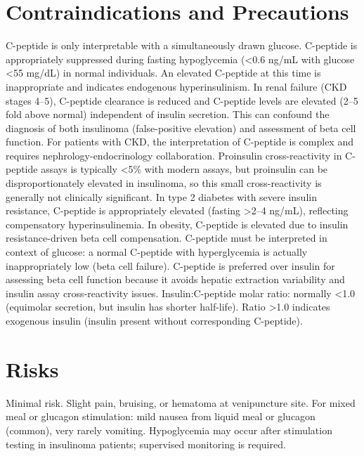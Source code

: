 \section*{Contraindications and Precautions}
C-peptide is only interpretable with a simultaneously drawn glucose. C-peptide is appropriately suppressed during fasting hypoglycemia (<0.6 ng/mL with glucose <55 mg/dL) in normal individuals. An elevated C-peptide at this time is inappropriate and indicates endogenous hyperinsulinism. In renal failure (CKD stages 4--5), C-peptide clearance is reduced and C-peptide levels are elevated (2--5 fold above normal) independent of insulin secretion. This can confound the diagnosis of both insulinoma (false-positive elevation) and assessment of beta cell function. For patients with CKD, the interpretation of C-peptide is complex and requires nephrology-endocrinology collaboration. Proinsulin cross-reactivity in C-peptide assays is typically <5\% with modern assays, but proinsulin can be disproportionately elevated in insulinoma, so this small cross-reactivity is generally not clinically significant. In type 2 diabetes with severe insulin resistance, C-peptide is appropriately elevated (fasting >2--4 ng/mL), reflecting compensatory hyperinsulinemia. In obesity, C-peptide is elevated due to insulin resistance-driven beta cell compensation. C-peptide must be interpreted in context of glucose: a normal C-peptide with hyperglycemia is actually inappropriately low (beta cell failure). C-peptide is preferred over insulin for assessing beta cell function because it avoids hepatic extraction variability and insulin assay cross-reactivity issues. Insulin:C-peptide molar ratio: normally <1.0 (equimolar secretion, but insulin has shorter half-life). Ratio >1.0 indicates exogenous insulin (insulin present without corresponding C-peptide).

\section*{Risks}
Minimal risk. Slight pain, bruising, or hematoma at venipuncture site. For mixed meal or glucagon stimulation: mild nausea from liquid meal or glucagon (common), very rarely vomiting. Hypoglycemia may occur after stimulation testing in insulinoma patients; supervised monitoring is required.

